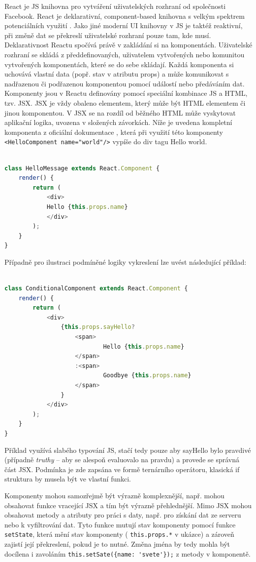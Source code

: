 
React je JS knihovna pro vytváření uživatelských rozhraní od společnosti Facebook. React je deklarativní, component-based knihovna s velkým spektrem potenciálních využití \cite{boduch2018react}. Jako jiné moderní UI knihovny v JS je taktéž reaktivní, při změně dat se překreslí uživatelské rozhraní pouze tam, kde musí. Deklarativnost Reactu spočívá právě v zakládání si na komponentách. Uživatelské rozhraní se skládá z předdefinovaných, uživatelem vytvořených nebo komunitou vytvořených komponentách, které se do sebe skládají. Každá komponenta si uchovává vlastní data (popř. stav v atributu props) a může komunikovat s nadřazenou či podřazenou komponentou pomocí událostí nebo předáváním dat. Komponenty jsou v Reactu definovány pomocí speciální kombinace JS a HTML, tzv. JSX. JSX je vždy obaleno elementem, který může být HTML elementem či jinou komponentou. V JSX se na rozdíl od běžného HTML může vyskytovat aplikační logika, uvozena v složených závorkách.  Níže je uvedena kompletní komponenta z oficiální dokumentace \cite{reactjsorg}, která při využití této komponenty \verb|<HelloComponent name="world"/>| vypíše do div tagu Hello world.

\begin{lstlisting}[language=JavaScript, caption=React komponenta]

class HelloMessage extends React.Component {
	render() {
		return (
			<div>
			Hello {this.props.name}
			</div>
		);
	}
}
\end{lstlisting}

Případně pro ilustraci podmíněné logiky vykreslení lze uvést následující příklad:

\begin{lstlisting}[language=JavaScript, caption=React komponenta s podmínkou]

class ConditionalComponent extends React.Component {
	render() {
		return (
			<div>
				{this.props.sayHello?
					<span>
							Hello {this.props.name}
					</span>
					:<span>
							Goodbye {this.props.name}
					</span>
				}
			</div>
		);
	}
}
\end{lstlisting}

Příklad využívá slabého typování JS, stačí tedy pouze aby sayHello bylo pravdivé (případně \emph{truthy} -- aby se alespoň evaluovalo na pravdu) a provede se správná část JSX. Podmínka je zde zapsána ve formě ternárního operátoru, klasická if struktura by musela být ve vlastní funkci.

Komponenty mohou samozřejmě být výrazně komplexnější, např. mohou obsahovat funkce vracející JSX a tím být výrazně přehlednější. Mimo JSX mohou obsahovat metody a atributy pro práci s daty, např. pro získání dat ze serveru nebo k vyfiltrování dat. Tyto funkce mutují stav komponenty pomocí funkce  \verb|setState|, která mění stav komponenty ( \verb|this.props.*| v ukázce) a zároveň zajistí její překreslení, pokud je to nutné. Změna jména by tedy mohla být docílena i zavoláním \verb|this.setSate({name: 'svete'});| z metody v komponentě.

